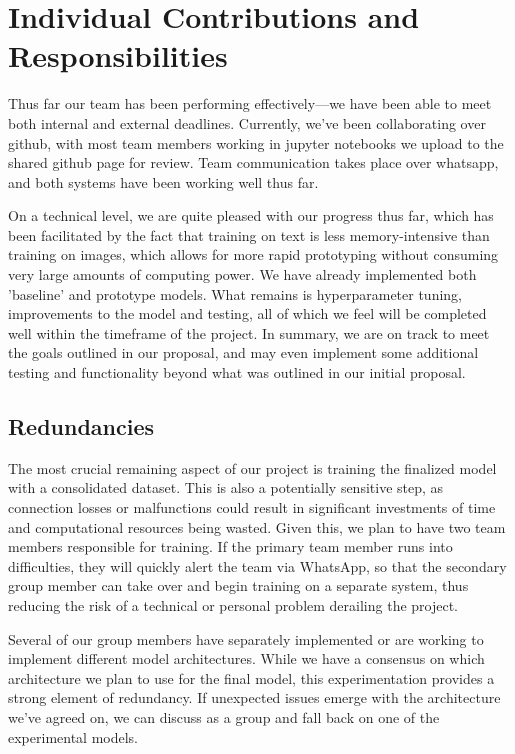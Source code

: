 \documentclass{article} %
\begin{document}
\section{Individual Contributions and Responsibilities}

Thus far our team has been performing effectively—we have been able to meet both internal and external deadlines. Currently, we've been collaborating over github, with most team members working in jupyter notebooks we upload to the shared github page for review. Team communication takes place over whatsapp, and both systems have been working well thus far. 

On a technical level, we are quite pleased with our progress thus far, which has been facilitated by the fact that training on text is less memory-intensive than training on images, which allows for more rapid prototyping without consuming very large amounts of computing power. We have already implemented both 'baseline' and prototype models. What remains is hyperparameter tuning, improvements to the model and testing, all of which we feel will be completed well within the timeframe of the project. In summary, we are on track to meet the goals outlined in our proposal, and may even implement some additional testing and functionality beyond what was outlined in our initial proposal.


\subsection{Redundancies}

The most crucial remaining aspect of our project is training the finalized model with a consolidated dataset. This is also a potentially sensitive step, as connection losses or malfunctions could result in significant investments of time and computational resources being wasted. Given this, we plan to have two team members responsible for training. If the primary team member runs into difficulties, they will quickly alert the team via WhatsApp, so that the secondary group member can take over and begin training on a separate system, thus reducing the risk of a technical or personal problem derailing the project. 

Several of our group members have separately implemented or are working to implement different model architectures. While we have a consensus on which architecture we plan to use for the final model, this experimentation provides a strong element of redundancy. If unexpected issues emerge with the architecture we've agreed on, we can discuss as a group and fall back on one of the experimental models.
\end{document}
